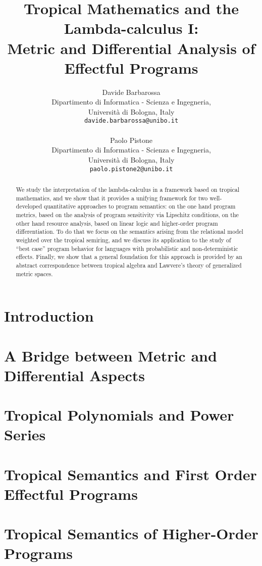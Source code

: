 \documentclass[english]{article}
\title{Tropical Mathematics and the Lambda-calculus I:\\
{\Large Metric and Differential Analysis of Effectful Programs}
} %
\author{
Davide {Barbarossa}\\
{\small Dipartimento di Informatica - Scienza e Ingegneria}, \\
{\small Universit\`a di Bologna, Italy}\\
{\small \texttt{davide.barbarossa@unibo.it}}\\
\ \\
Paolo {Pistone}\\
{\small Dipartimento di Informatica - Scienza e Ingegneria}, \\
{\small Universit\`a di Bologna, %
Italy}\\
{\small \texttt{paolo.pistone2@unibo.it}}
}
\date{}
\begin{document}
\maketitle

\begin{abstract}
We study the interpretation of the lambda-calculus in a framework based on tropical mathematics, and we show that it provides a unifying framework for two well-developed quantitative approaches to program semantics: on the one hand program metrics, based on the analysis of program sensitivity via Lipschitz conditions, on the other hand resource analysis, based on linear logic and higher-order program differentiation. 
To do that we focus on the semantics arising from the relational model weighted over the tropical semiring, and we discuss its application to the study of “best case” program behavior for languages with probabilistic and non-deterministic effects. Finally, we show that a general foundation for this approach is provided by an abstract correspondence between tropical algebra and Lawvere’s theory of generalized metric spaces.
\end{abstract}

\section{Introduction}



\section{A Bridge between Metric and Differential Aspects}\label{section5bis}



\section{Tropical Polynomials and Power Series}\label{section2}


\section{Tropical Semantics and First Order Effectful Programs}\label{section22}


\section{Tropical Semantics of Higher-Order Programs}\label{section3}

\end{document}
